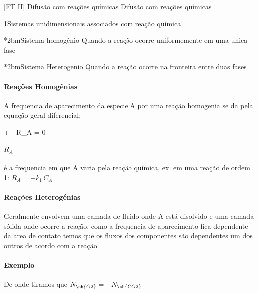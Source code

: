 \documentclass[\mainfilename]{subfiles}
\begin{document}
\graphicspath{{\subfix{./.build/figures/FT_II-Slides_Annotations.6}}}

[FT II]
{Difusão com reações químicas} %
{Difusão com reações químicas} %

\begin{sectionBox}1{Sistemas unidimensionais associados com reação química} %
    
    \begin{multicols}{2}
        \begin{sectionBox}*2bm{Sistema homogênio} %
            Quando a reação ocorre uniformemente em uma unica fase
        \end{sectionBox}
        \begin{sectionBox}*2bm{Sistema Heterogenio} %
            Quando a reação ocorre na fronteira entre duas fases
        \end{sectionBox}
    \end{multicols}

    \paragraph*{Reações Homogênias}
    A frequencia de aparecimento da especie A por uma reação homogenia se da pela equação geral diferencial:
    \begin{BM}
        + 
        - R_A
        = 0
    \end{BM}
    \paragraph*{\(R_A\)} é a frequencia em que A varia pela reação química, ex. em uma reação de ordem 1: \(R_A=-k_1\,C_{A}\)

    \paragraph*{Reações Heterogénias}
    Geralmente envolvem uma camada de fluido onde A está disolvido e uma camada sólida onde ocorre a reação, como a frequencia de aparecimento fica dependente da area de contato temos que os fluxos dos componentes são dependentes um dos outros de acordo com a reação
    \paragraph*{Exemplo}
    \begin{center}
    \end{center}
    De onde tiramos que \(N_{\ch{O2}}=-N_{\ch{CO2}}\)
    
\end{sectionBox}
\end{document}
